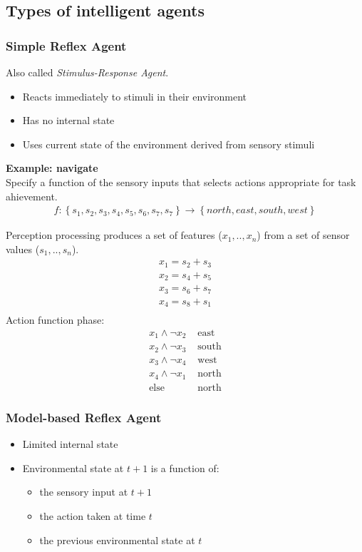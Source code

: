 \documentclass[a4paper]{article}
\begin{document}
\subsection{Types of intelligent agents}

\subsubsection{Simple Reflex Agent}
Also called \textit{Stimulus-Response Agent}.
\begin{itemize}
  \item Reacts immediately to stimuli in their environment
  \item Has no internal state
  \item Uses current state of the environment derived from sensory stimuli
\end{itemize}

\vspace{5mm}
\begin{framed}
\noindent \textbf{Example: navigate}\\
Specify a function of the sensory inputs that selects actions appropriate for
task ahievement.
\begin{align}
  f: \left\{ s_1,s_2,s_3,s_4,s_5,s_6,s_7,s_7 \right\} \rightarrow \left\{ north,
    east, south, west
  \right\}
\end{align}

Perception processing produces a set of features ($x_1,..,x_n$) from a set of
sensor values ($s_1,..,s_n$).
\begin{align}
  x_1=s_2+s_3\\
  x_2=s_4+s_5\\
  x_3=s_6+s_7\\
  x_4=s_8+s_1\\
\end{align}
Action function phase:
\begin{align}
  x_1 \land \lnot x_2 &\mbox{ east} \\
  x_2 \land \lnot x_3 &\mbox{ south} \\
  x_3 \land \lnot x_4 &\mbox{ west} \\
  x_4 \land \lnot x_1 &\mbox{ north} \\
  \mbox{else} &\mbox{ north}
\end{align}
\end{framed}
\subsubsection{Model-based Reflex Agent}
\begin{itemize}
  \item Limited internal state
  \item Environmental state at $t+1$ is a function of:
    \begin{itemize}
      \item the sensory input at $t+1$
      \item the action taken at time $t$
      \item the previous environmental state at $t$
    \end{itemize}
\end{itemize}
\end{document}
